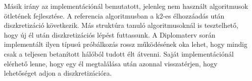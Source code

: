 Másik irány az implementációnál bemutatott, jelenleg nem használt algoritmusok ötletének fejlesztése. A referencia algoritmusban a k2-es élhozzáadás után diszkretizáció következik. Más struktúra tanuló algoritmusoknál is tesztelhető, hogy új él után diszkretizációs lépést futtassunk. A Diplomaterv során implementált ilyen típusú próbálkozás rossz működésének oka lehet, hogy mindig csak a teljesen betanított hálóból tudott élt átvenni. Saját implementációnál elérhető lenne, hogy egy él megtalálása után azonnal visszatérjen, hogy lehetőséget adjon a diszkretizációra.